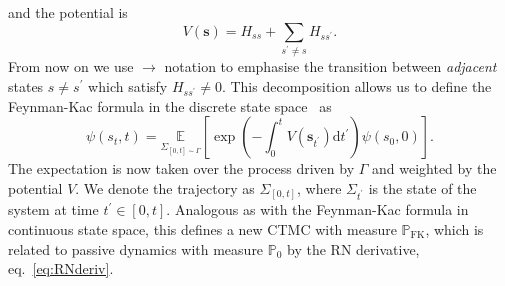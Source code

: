 and the potential is
\begin{equation}
V(\boldsymbol{s})=H_{s s}+\sum_{s^{\prime} \neq s} H_{s s^{\prime}}.
\end{equation}
From now on we use $\rightarrow$ notation to emphasise the transition between \emph{adjacent} states $s\neq s^\prime$ which satisfy $H_{s s^{\prime}} \neq 0$. This decomposition allows us to define the Feynman-Kac formula in the discrete state space~\cite{rogers2000diffusions} as
\begin{equation}
	\label{eq:fkac_disc}
	\psi\left(s_t, t\right)=
	\underset{\Sigma_{[0, t] \sim \Gamma}}{\mathbb{E}}
	\left[
	\exp \left(-\int_{0}^{t} V\left(\boldsymbol{s}_{t^{\prime}}\right) \mathrm{d} t^{\prime}\right) \psi\left(s_0, 0\right)
	\right].
\end{equation}
The expectation is now taken over the process driven by $\Gamma$ and weighted by the potential $V$. We denote the trajectory as $\Sigma_{[0, t]}$, where $\Sigma_{t^\prime}$ is the state of the system at time $t^\prime \in [0, t]$. Analogous as with the Feynman-Kac formula in continuous state space, this defines a new CTMC with measure $\mathbb{P}_{\text{FK}}$, which is related to  passive dynamics with measure $\mathbb{P}_0$ by the RN derivative, eq.~\eqref{eq:RNderiv}.

